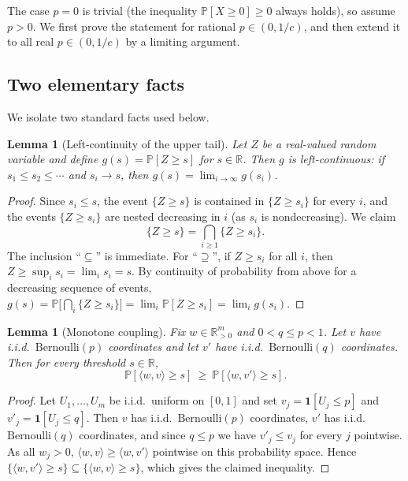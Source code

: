 \documentclass[11pt]{amsart}
\theoremstyle{plain}
\newtheorem{lemma}[theorem]{Lemma}
\def\bR{\mathbb{R}}
\def\Pb{\mathbb{P}}
\begin{document}
The case $p=0$ is trivial (the inequality $\Pb[X\ge 0]\ge 0$ always holds), so
assume $p>0$. We first prove the statement for rational $p\in(0,1/c)$, and then
extend it to all real $p\in(0,1/c)$ by a limiting argument.

\subsection{Two elementary facts}

We isolate two standard facts used below.

\begin{lemma}[Left-continuity of the upper tail]\label{lem:leftcont}
Let $Z$ be a real-valued random variable and define
$g(s)=\Pb[Z\ge s]$ for $s\in\bR$. Then $g$ is left-continuous: if
$s_1\le s_2\le\cdots$ and $s_i\to s$, then $g(s)=\lim_{i\to\infty}g(s_i)$.
\end{lemma}

\begin{proof}
Since $s_i\le s$, the event $\{Z\ge s\}$ is contained in $\{Z\ge s_i\}$ for every
$i$, and the events $\{Z\ge s_i\}$ are nested decreasing in $i$ (as $s_i$ is
nondecreasing). We claim
\[
\{Z\ge s\}=\bigcap_{i\ge1}\{Z\ge s_i\}.
\]
The inclusion ``$\subseteq$'' is immediate. For ``$\supseteq$'', if $Z\ge s_i$ for
all $i$, then $Z\ge\sup_i s_i=\lim_i s_i=s$. By continuity of probability from
above for a decreasing sequence of events,
$g(s)=\Pb\big[\bigcap_i\{Z\ge s_i\}\big]=\lim_i\Pb[Z\ge s_i]=\lim_i g(s_i)$.
\end{proof}

\begin{lemma}[Monotone coupling]\label{lem:coupling}
Fix $w\in\bR_{>0}^m$ and $0<q\le p<1$. Let $v$ have i.i.d.\
$\mathrm{Bernoulli}(p)$ coordinates and let $v'$ have i.i.d.\
$\mathrm{Bernoulli}(q)$ coordinates. Then for every threshold $s\in\bR$,
\[
\Pb[\langle w,v\rangle\ge s]\ \ge\ \Pb[\langle w,v'\rangle\ge s].
\]
\end{lemma}

\begin{proof}
Let $U_1,\dots,U_m$ be i.i.d.\ uniform on $[0,1]$ and set
$v_j=\mathbf 1[U_j\le p]$ and $v'_j=\mathbf 1[U_j\le q]$. Then $v$ has i.i.d.\
$\mathrm{Bernoulli}(p)$ coordinates, $v'$ has i.i.d.\
$\mathrm{Bernoulli}(q)$ coordinates, and since $q\le p$ we have $v'_j\le v_j$ for
every $j$ pointwise. As all $w_j>0$,
$\langle w,v\rangle\ge\langle w,v'\rangle$ pointwise on this probability space.
Hence $\{\langle w,v'\rangle\ge s\}\subseteq\{\langle w,v\rangle\ge s\}$, which
gives the claimed inequality.
\end{proof}
\end{document}
